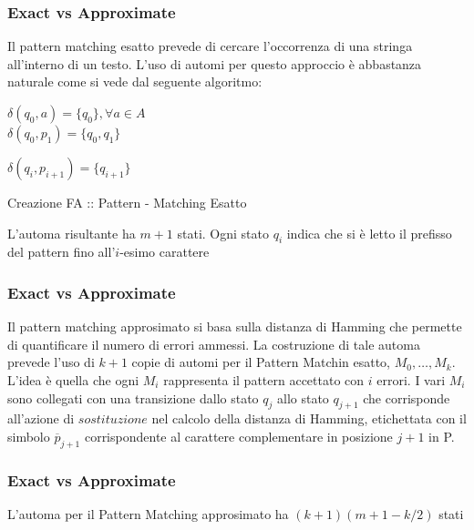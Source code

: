 \documentclass{beamer}
\begin{document}
\begin{frame}
\frametitle{Exact vs Approximate}
Il pattern matching esatto prevede di cercare l'occorrenza di una stringa all'interno di un testo.
L'uso di automi per questo approccio è abbastanza naturale come si vede dal seguente algoritmo:\\
\begin{algorithm}[H]
\begin{algorithmic}[1]

\STATE $\delta(q_0,a) = \{q_0\} , \forall a \in A$\\

\STATE $\delta(q_0,p_1) = \{q_0,q_1\}$\\


\STATE $\delta(q_i,p_{i+1}) = \{q_{i+1}\}$

\ENDFOR
\end{algorithmic}
\caption{Creazione FA :: Pattern - Matching Esatto}
\end{algorithm}

L'automa risultante ha $m+1$ stati. Ogni stato $q_i$ indica che si è letto il prefisso del pattern fino all'$i$-esimo carattere

\end{frame}

\begin{frame}
\frametitle{Exact vs Approximate}

Il pattern matching approsimato si basa sulla distanza di Hamming che permette di quantificare il numero di errori ammessi.
La costruzione di tale automa prevede l'uso di $k+1$ copie di automi per il Pattern Matchin esatto, $M_0,\dots ,M_k$. \\
L'idea è quella che ogni $M_i$ rappresenta il pattern accettato con $i$ errori.
I vari $M_i$ sono collegati con una transizione dallo stato $q_j$ allo stato $q_{j+1}$ che corrisponde all'azione di $sostituzione$ nel calcolo della distanza di Hamming, etichettata con il simbolo $\overline{p}_{j+1}$ corrispondente al carattere complementare in posizione $j+1$ in P.\\

\end{frame}

\begin{frame}
\frametitle{Exact vs Approximate}
\begin{theorem}[]
L'automa per il Pattern Matching approsimato ha $(k+1)(m+1 - k/2)$ stati
\end{theorem}

%

\end{frame}
\end{document}

